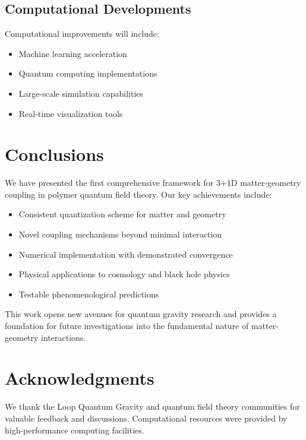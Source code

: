 \documentclass[11pt]{article}
\begin{document}
\subsection{Computational Developments}

Computational improvements will include:
\begin{itemize}
\item Machine learning acceleration
\item Quantum computing implementations
\item Large-scale simulation capabilities
\item Real-time visualization tools
\end{itemize}

\section{Conclusions}

We have presented the first comprehensive framework for 3+1D matter-geometry coupling in polymer quantum field theory. Our key achievements include:

\begin{itemize}
\item Consistent quantization scheme for matter and geometry
\item Novel coupling mechanisms beyond minimal interaction
\item Numerical implementation with demonstrated convergence
\item Physical applications to cosmology and black hole physics
\item Testable phenomenological predictions
\end{itemize}

This work opens new avenues for quantum gravity research and provides a foundation for future investigations into the fundamental nature of matter-geometry interactions.

\section*{Acknowledgments}

We thank the Loop Quantum Gravity and quantum field theory communities for valuable feedback and discussions. Computational resources were provided by high-performance computing facilities.



\end{document}

